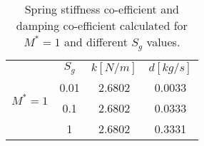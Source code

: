  \begin{table}[H]
 \begin{centering}
  \begin{tabular}[c]{|c|c|c|c|}
   \hline
   \multirow{4}{4em}{$M^{*}=1$} & $S_{g}$ & $k[N/m]$ & $d[kg/s]$\\\cline{2-4}
   & 0.01 & 2.6802 & 0.0033 \\ \cline{2-4}
   & 0.1 & 2.6802 & 0.0333 \\ \cline{2-4}
   & 1 & 2.6802 & 0.3331 \\ 
   \hline
  \end{tabular}
 \caption{Spring stiffness co-efficient and damping co-efficient calculated for $M^*=1$ and different $S_{g}$ values.}
 \label{table:2.1}
 \end{centering}
 \end{table}
